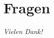 \section{Fragen}\label{sec:fragen}
\begin{frame}
    \centering \Large
    \emph{Vielen Dank!}
\end{frame}
